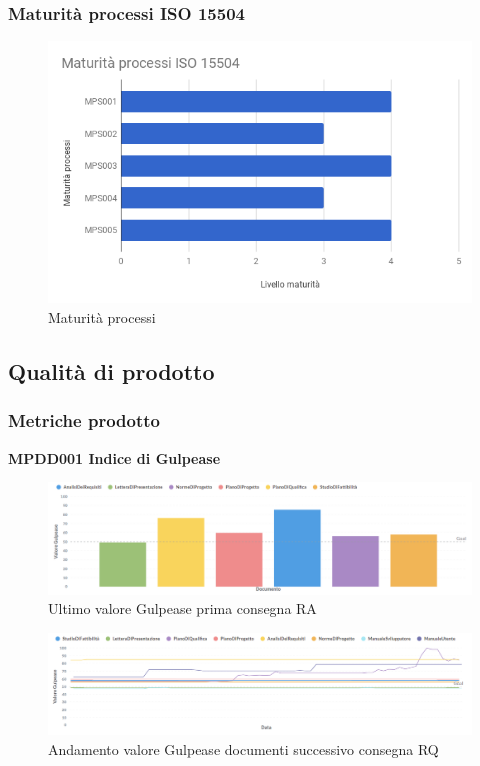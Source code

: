 \documentclass[PianoDiQualifica.tex]{subfiles}
\begin{document}
\subsubsection{Maturità processi ISO 15504}
\begin{figure}[H]
	\centering
	\includegraphics[width=0.9\linewidth]{RA/Processi}
	\caption{Maturità processi}
	\label{fig:processi}
\end{figure}



\newpage
\subsection{Qualità di prodotto}

\subsubsection{Metriche prodotto}

\textbf{MPDD001 Indice di Gulpease}
\begin{figure}[H]
	\centering
	\includegraphics[width=1\linewidth]{RA/gulpease}
	\caption{Ultimo valore Gulpease prima consegna RA}
	\label{fig:processi}
\end{figure}

\begin{figure}[H]
	\centering
	\includegraphics[width=1\linewidth]{RA/gulpeasegrid}
	\caption{Andamento valore Gulpease documenti successivo consegna RQ}
	\label{fig:processi}
\end{figure}
\end{document}
